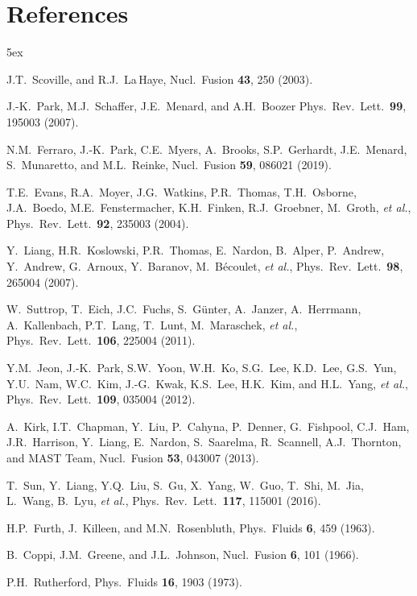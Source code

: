 \documentclass[12pt,prb,aps]{revtex4-1}
\begin{document}
\section*{References}
\begin{thebibliography}{99}\baselineskip 5ex

 J.T.~Scoville, and R.J.~La\,Haye, Nucl.\ Fusion {\bf 43}, 250 (2003).

  J.-K.~Park, M.J.~Schaffer, J.E.~Menard, and A.H.~Boozer  Phys.\  Rev.\  Lett.\  {\bf 99}, 195003 (2007).

 N.M.~Ferraro, J.-K.~Park, C.E.~Myers, A.~Brooks, S.P.~Gerhardt, J.E.~Menard, S.~Munaretto, and M.L.~Reinke, Nucl.\ Fusion {\bf 59}, 086021 (2019).

  T.E.~Evans, R.A.~Moyer, J.G.~Watkins, P.R.~Thomas, T.H.~Osborne, J.A.~Boedo, M.E.~Fenstermacher, K.H.~Finken, R.J.~Groebner, M.~Groth, {\it et al.},  
Phys.\ Rev.\ Lett.\ {\bf 92}, 235003 (2004).

 Y.~Liang,  H.R.~Koslowski, P.R.~Thomas, E.~Nardon, B.~Alper, P.~Andrew, Y.~Andrew, G.~Arnoux,  Y.~Baranov, M.~B\'{e}coulet, {\it et al.},  
Phys.\ Rev.\ Lett.\ {\bf 98}, 265004 (2007).

 W.~Suttrop,  T.~Eich, J.C.~Fuchs, S.~G\"{u}nter, A.~Janzer, A.~Herrmann, A.~Kallenbach, P.T.~Lang, T.~Lunt, M.~Maraschek, {\it et al.},   
Phys.\ Rev.\ Lett.\ {\bf 106}, 225004 (2011).

 Y.M.~Jeon,  J.-K.~Park, S.W.~Yoon, W.H.~Ko, S.G.~Lee, K.D.~Lee, G.S.~Yun, Y.U.~Nam, W.C.~Kim, J.-G.~Kwak, K.S.~Lee, H.K.~Kim, and H.L.~Yang, {\it et al.}, 
Phys.\ Rev.\ Lett.\ {\bf 109}, 035004 (2012).

 A.~Kirk, I.T.~Chapman, Y.~Liu, P.~Cahyna, P.~Denner, G.~Fishpool, C.J.~Ham, J.R.~Harrison, Y.~Liang, E.~Nardon, S.~Saarelma, R.~Scannell, A.J.~Thornton, and  MAST Team, 
Nucl.\  Fusion {\bf 53}, 043007 (2013).

 T.~Sun,  Y.~Liang, Y.Q.~Liu, S.~Gu, X.~Yang, W.~Guo, T.~Shi, M.~Jia, L.~Wang, B.~Lyu, {\it et al.},  
Phys.\ Rev.\ Lett.\  {\bf 117}, 115001 (2016).

 H.P.~Furth,  J.~Killeen, and M.N.~Rosenbluth,  Phys.\ Fluids {\bf 6}, 459 (1963).

 B.~Coppi, J.M.~Greene, and J.L.~Johnson, Nucl.\ Fusion {\bf 6}, 101 (1966).

 P.H.~Rutherford,  Phys.\ Fluids  {\bf 16}, 1903 (1973).


\end{thebibliography}
\end{document}
